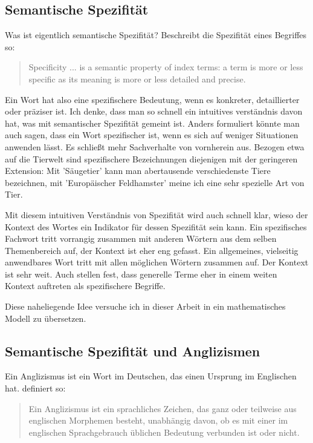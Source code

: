 \documentclass[11pt,numbers=noenddot]{scrartcl}
\begin{document}
\subsection*{Semantische Spezifität}
Was ist eigentlich semantische Spezifität? \citet[S. 11]{sparckjones1972} Beschreibt die Spezifität eines Begriffes so:
\begin{quote}
  Specificity ... is a semantic property of index terms: a term is more or less specific as its meaning is more or less detailed and precise.
\end{quote}

Ein Wort hat also eine spezifischere Bedeutung, wenn es konkreter, detaillierter oder präziser ist. Ich denke, dass man so schnell ein intuitives verständnis davon hat, was mit semantischer Spezifität gemeint ist. Anders formuliert könnte man auch sagen, dass ein Wort spezifischer ist, wenn es sich auf weniger Situationen anwenden lässt. Es schließt mehr Sachverhalte von vornherein aus. Bezogen etwa auf die Tierwelt sind spezifischere Bezeichnungen diejenigen mit der geringeren Extension: Mit 'Säugetier' kann man abertausende verschiedenste Tiere bezeichnen, mit 'Europäischer Feldhamster' meine ich eine sehr spezielle Art von Tier.

Mit diesem intuitiven Verständnis von Spezifität wird auch schnell klar, wieso der Kontext des Wortes ein Indikator für dessen Spezifität sein kann. Ein spezifisches Fachwort tritt vorrangig zusammen mit anderen Wörtern aus dem selben Themenbereich auf, der Kontext ist eher eng gefasst. Ein allgemeines, vielseitig anwendbares Wort tritt mit allen möglichen Wörtern zusammen auf. Der Kontext ist sehr weit. Auch \cite{weeds-weir-mccarthy:2004:COLING} stellen fest, dass generelle Terme eher in einem weiten Kontext auftreten als spezifischere Begriffe.

Diese naheliegende Idee versuche ich in dieser Arbeit in ein mathematisches Modell zu übersetzen.

\subsection*{Semantische Spezifität und Anglizismen}

Ein Anglizismus ist ein Wort im Deutschen, das einen Ursprung im Englischen hat. \citet[S. 38]{schütte1996schöne} definiert so:

\begin{quote}
    Ein Anglizismus ist ein sprachliches Zeichen, das ganz oder teilweise aus englischen Morphemen besteht, unabhängig davon, ob es mit einer im englischen Sprachgebrauch üblichen Bedeutung verbunden ist oder nicht.
\end{quote}
\end{document}
